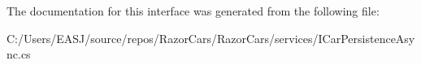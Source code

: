 The documentation for this interface was generated from the following file\+:\begin{DoxyCompactItemize}
\item 
C\+:/\+Users/\+E\+A\+S\+J/source/repos/\+Razor\+Cars/\+Razor\+Cars/services/I\+Car\+Persistence\+Async.\+cs\end{DoxyCompactItemize}
